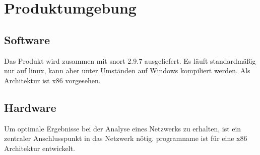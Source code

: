 \chapter{Produktumgebung}

\section{Software}
Das Produkt wird zusammen mit \gls{snort} 2.9.7 ausgeliefert. Es läuft standardmäßig nur auf \gls{linux}, kann aber unter Umständen auf Windows kompiliert werden. Als Architektur ist \gls{x86} vorgesehen.

\section{Hardware}
Um optimale Ergebnisse bei der Analyse eines Netzwerks zu erhalten, ist ein zentraler Anschlusspunkt in das Netzwerk nötig.
\gls{programname} ist für eine \gls{x86} Architektur entwickelt.
